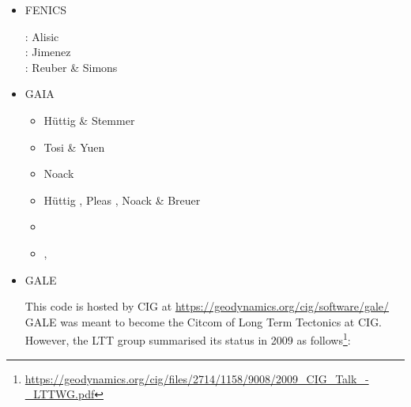 \begin{itemize}
\item {\codefont FENICS} 

\begin{scriptsize}
\noindent
\twothousandfourteen: Alisic \etal \cite{alrk14}\\
\twothousandseventeen: Jimenez \etal \cite{jidb17}\\
\twothousandtwenty: Reuber \& Simons \cite{resi20}
\end{scriptsize}


\item {\codefont GAIA} 

\begin{scriptsize}
\begin{itemize}
\item[\twothousandeight] H{\"u}ttig \& Stemmer \cite{hust08b} 
\item[\twothousandeleven] Tosi \& Yuen \cite{toyu11} 
\item[\twothousandtwelve] Noack \etal \cite{nobs12}
\item[\twothousandthirteen] H{\"u}ttig \etal \cite{hutm13}, Pleas \etal \cite{plth13}, 
                            Noack \& Breuer \cite{nobr13} 
\item[\twothousandnineteen]  \textcite{neum19}
\item[\twothousandtwenty]    \textcite{agtb20},  \textcite{sctp20}
\end{itemize}
\end{scriptsize}

\item {\codefont GALE} 

This code is hosted by CIG at \url{https://geodynamics.org/cig/software/gale/}
GALE was meant to become the Citcom of Long Term Tectonics at CIG. However, 
the LTT group summarised its status in 2009 as 
follows\footnote{\url{https://geodynamics.org/cig/files/2714/1158/9008/2009_CIG_Talk_-_LTTWG.pdf}}:


\end{itemize}
